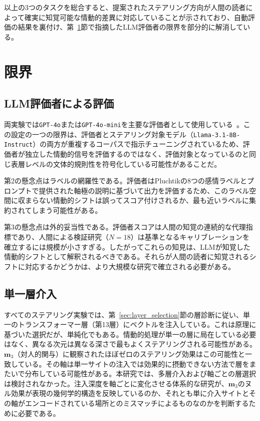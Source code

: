 以上の3つのタスクを総合すると、提案されたステアリング方向が人間の読者によって確実に知覚可能な情動的差異に対応していることが示されており、自動評価の結果を裏付け、第~\ref{sec:eval-limitations}節で指摘したLLM評価者の限界を部分的に解消している。
\section{限界}
\label{sec:eval-limitations}

\subsection{LLM評価者による評価}

両実験では\texttt{GPT-4o}または\texttt{GPT-4o-mini}を主要な評価者として使用している~\cite{gu2025surveyllmasajudge}。この設定の一つの限界は、評価者とステアリング対象モデル（\texttt{Llama-3.1-8B-Instruct}）の両方が重複するコーパスで指示チューニングされているため、評価者が独立した情動的信号を評価するのではなく、評価対象となっているのと同じ表層レベルの文体的規則性を符号化している可能性があることだ。\par

第2の懸念点はラベルの網羅性である。評価者はPluchtikの8つの感情ラベルとプロンプトで提供された軸極の説明に基づいて出力を評価するため、このラベル空間に収まらない情動的シフトは誤ってスコア付けされるか、最も近いラベルに集約されてしまう可能性がある。\par

第3の懸念点は外的妥当性である。評価者スコアは人間の知覚の連続的な代理指標であり、人間による検証研究（$N = 18$）は基準となるキャリブレーションを確立するには規模が小さすぎる。したがってこれらの知見は、LLMが知覚した情動的シフトとして解釈されるべきである。それらが人間の読者に知覚されるシフトに対応するかどうかは、より大規模な研究で確立される必要がある。\par

\subsection{単一層介入}

すべてのステアリング実験では、第~\ref{sec:layer_selection}節の層診断に従い、単一のトランスフォーマー層（第13層）にベクトルを注入している。これは原理に基づいた選択だが、単純化でもある。情動的処理が単一の層に局在している必要はなく、異なる次元は異なる深さで最もよくステアリングされる可能性がある。$\mathbf{m}_3$（対人的関与）に観察されたほぼゼロのステアリング効果はこの可能性と一致している。その軸は単一サイトの注入では効果的に摂動できない方法で層をまたいで分布している可能性がある。本研究では、多層介入および軸ごとの層選択は検討されなかった。注入深度を軸ごとに変化させる体系的な研究が、$\mathbf{m}_3$のヌル効果が表現の幾何学的構造を反映しているのか、それとも単に介入サイトとその軸がエンコードされている場所とのミスマッチによるものなのかを判断するために必要である。\par

